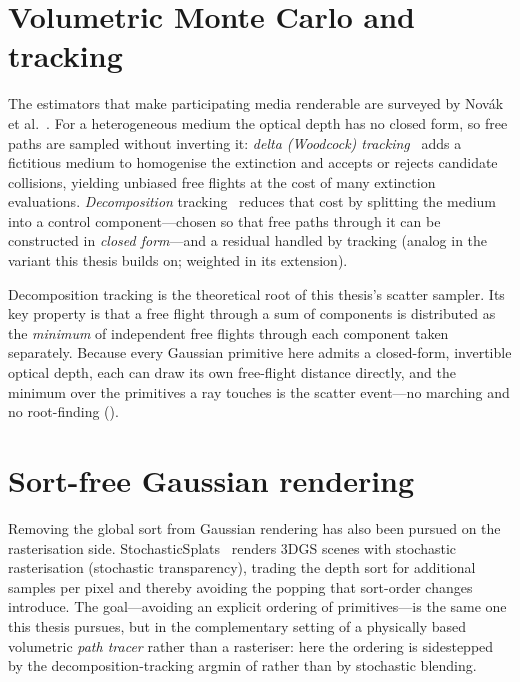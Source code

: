\section{Volumetric Monte Carlo and tracking}
\label{sec:volumetric-mc}

The estimators that make participating media renderable are surveyed by
Nov\'ak et al.~\cite{MonteCarlo}. For a heterogeneous medium the optical depth has no closed form, so
free paths are sampled without inverting it: \emph{delta (Woodcock) tracking}~\cite{Woodcock1965}
adds a fictitious medium to homogenise the extinction and accepts or rejects candidate collisions,
yielding unbiased free flights at the cost of many extinction evaluations. \emph{Decomposition} tracking~\cite{Kutz2017} reduces that cost by splitting the medium into a control
component---chosen so that free paths through it can be constructed in \emph{closed form}---and a
residual handled by tracking (analog in the variant this thesis builds on; weighted in its extension).

Decomposition tracking is the theoretical root of this thesis's scatter sampler. Its key property is
that a free flight through a sum of components is distributed as the \emph{minimum} of independent
free flights through each component taken separately. Because every Gaussian primitive here admits a
closed-form, invertible optical depth, each can draw its own free-flight distance directly, and the
minimum over the primitives a ray touches is the scatter event---no marching and no
root-finding ().

\section{Sort-free Gaussian rendering}
\label{sec:sort-free}

Removing the global sort from Gaussian rendering has also been pursued on the rasterisation side.
StochasticSplats~\cite{StochasticSplats2025} renders 3DGS scenes with stochastic rasterisation
(stochastic transparency), trading the depth sort for additional samples per pixel and thereby
avoiding the popping that sort-order changes introduce. The goal---avoiding an explicit
ordering of primitives---is the same one this thesis pursues, but in the complementary setting of a
physically based volumetric \emph{path tracer} rather than a rasteriser: here the ordering is sidestepped
by the decomposition-tracking argmin of  rather than by stochastic blending.

